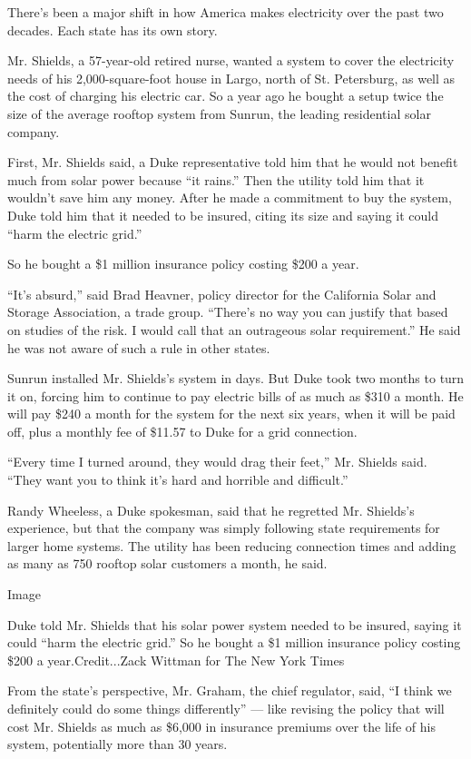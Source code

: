 There's been a major shift in how America makes electricity over the
past two decades. Each state has its own story.

Mr. Shields, a 57-year-old retired nurse, wanted a system to cover the
electricity needs of his 2,000-square-foot house in Largo, north of St.
Petersburg, as well as the cost of charging his electric car. So a year
ago he bought a setup twice the size of the average rooftop system from
Sunrun, the leading residential solar company.

First, Mr. Shields said, a Duke representative told him that he would
not benefit much from solar power because ``it rains.'' Then the utility
told him that it wouldn't save him any money. After he made a commitment
to buy the system, Duke told him that it needed to be insured, citing
its size and saying it could ``harm the electric grid.''

So he bought a \$1 million insurance policy costing \$200 a year.

``It's absurd,'' said Brad Heavner, policy director for the California
Solar and Storage Association, a trade group. ``There's no way you can
justify that based on studies of the risk. I would call that an
outrageous solar requirement.'' He said he was not aware of such a rule
in other states.

Sunrun installed Mr. Shields's system in days. But Duke took two months
to turn it on, forcing him to continue to pay electric bills of as much
as \$310 a month. He will pay \$240 a month for the system for the next
six years, when it will be paid off, plus a monthly fee of \$11.57 to
Duke for a grid connection.

``Every time I turned around, they would drag their feet,'' Mr. Shields
said. ``They want you to think it's hard and horrible and difficult.''

Randy Wheeless, a Duke spokesman, said that he regretted Mr. Shields's
experience, but that the company was simply following state requirements
for larger home systems. The utility has been reducing connection times
and adding as many as 750 rooftop solar customers a month, he said.

Image

Duke told Mr. Shields that his solar power system needed to be insured,
saying it could ``harm the electric grid.'' So he bought a \$1 million
insurance policy costing \$200 a year.Credit...Zack Wittman for The New
York Times

From the state's perspective, Mr. Graham, the chief regulator, said, ``I
think we definitely could do some things differently'' --- like revising
the policy that will cost Mr. Shields as much as \$6,000 in insurance
premiums over the life of his system, potentially more than 30 years.

